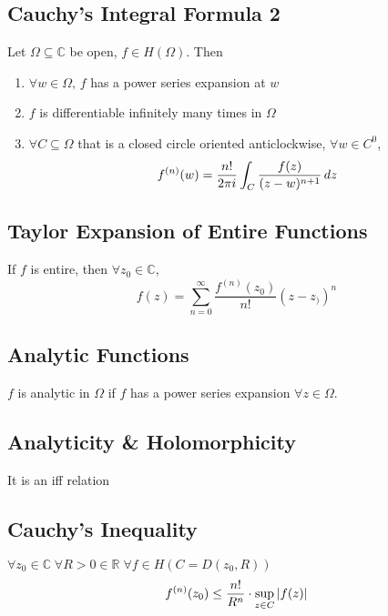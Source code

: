\subsection{Cauchy's Integral Formula 2} %
\label{sub:cauchy_s_integral_formula_2}
Let $\Omega \subseteq \mathbb{C}$ be open, $f \in H(\Omega)$. Then
\begin{enumerate}
	\item $\forall w \in \Omega, \, f$ has a power series expansion at $w$
	\item $f$ is differentiable infinitely many times in $\Omega$
	\item $\forall C \subseteq \Omega$ that is a closed circle oriented anticlockwise, $\forall w \in C^0$,
	\begin{equation*}
		f^{(n)}(w) = \frac{n!}{2 \pi i} \int_{C} \frac{f(z)}{(z - w)^{n + 1}} \mathop{}\!d{z}
	\end{equation*}
\end{enumerate}

\subsection{Taylor Expansion of Entire Functions} %
\label{sub:taylor_expansion_of_entire_functions}
If $f$ is entire, then $\forall z_0 \in \mathbb{C}$,
\begin{equation*}
	f(z) = \sum_{n=0}^{\infty} \frac{f^{(n)}(z_0)}{n!} (z - z_))^n
\end{equation*}

\subsection{Analytic Functions} %
\label{sub:analytic_functions}
$f$ is analytic in $\Omega$ if $f$ has a power series expansion $\forall z \in \Omega$.

\subsection{Analyticity \& Holomorphicity} %
\label{sub:analyticity_&_holomorphicity}
It is an iff relation

\subsection{Cauchy's Inequality} %
\label{sub:cauchy_s_inequality}
$\forall z_0 \in \mathbb{C} \; \forall R > 0 \in \mathbb{R} \; \forall f \in H(C = D(z_0, R))$
\begin{equation*}
	f^{(n)}(z_0) \leq \frac{n!}{R^n} \cdot \sup_{z \in C} \left|f(z)\right|
\end{equation*}

